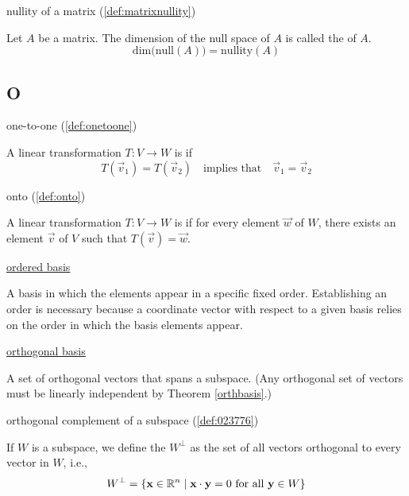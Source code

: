 \documentclass{ximera}
\begin{document}
nullity of a matrix (\ref{def:matrixnullity})
\begin{expandable}
    Let $A$ be a matrix.  The dimension of the null space of $A$ is called the  of $A$.
$$\mbox{dim}\Big(\mbox{null}(A)\Big)=\mbox{nullity}(A)$$
\end{expandable}


\subsection{O}
one-to-one (\ref{def:onetoone})
\begin{expandable}
    A linear transformation $T:V\rightarrow W$ is  if 
$$T(\vec{v}_1)=T(\vec{v}_2)\quad \text{implies that}\quad \vec{v}_1=\vec{v}_2$$
\end{expandable}

onto (\ref{def:onto})
\begin{expandable}
    A linear transformation $T:V\rightarrow W$ is  if for every element $\vec{w}$ of $W$, there exists an element $\vec{v}$ of $V$ such that $T(\vec{v})=\vec{w}$.
\end{expandable}

\href{https://ximera.osu.edu/oerlinalg/LinearAlgebra/VSP-0060/main}{ordered basis}
\begin{expandable}
    A basis in which the elements appear in a specific fixed order.  Establishing an order is necessary because a coordinate vector with respect to a given basis relies on the order in which the basis elements appear.
\end{expandable}

\href{https://ximera.osu.edu/oerlinalg/LinearAlgebra/RTH-0010/main}{orthogonal basis}
\begin{expandable}
    A set of orthogonal vectors that spans a subspace. (Any orthogonal set of vectors must be linearly independent by Theorem \ref{orthbasis}.)
\end{expandable}

orthogonal complement of a subspace (\ref{def:023776})
\begin{expandable}
    If $W$ is a subspace, we define the  $W^\perp$ as the set of all vectors orthogonal to every vector in $W$, i.e.,
\begin{equation*}
W^\perp = \{\mathbf{x} \in\mathbb{R}^n \mid \mathbf{x} \cdot \mathbf{y} = 0 \mbox{ for all } \mathbf{y} \in W\}
\end{equation*}
\end{expandable}
\end{document}
